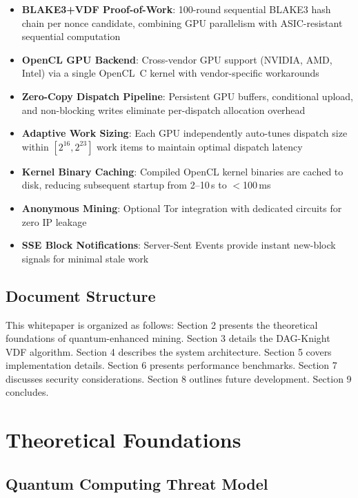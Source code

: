\documentclass[11pt,a4paper]{article}
\begin{document}
\begin{itemize}
    \item \textbf{BLAKE3+VDF Proof-of-Work}: 100-round sequential BLAKE3 hash chain per nonce candidate, combining GPU parallelism with ASIC-resistant sequential computation
    \item \textbf{OpenCL GPU Backend}: Cross-vendor GPU support (NVIDIA, AMD, Intel) via a single OpenCL~C kernel with vendor-specific workarounds
    \item \textbf{Zero-Copy Dispatch Pipeline}: Persistent GPU buffers, conditional upload, and non-blocking writes eliminate per-dispatch allocation overhead
    \item \textbf{Adaptive Work Sizing}: Each GPU independently auto-tunes dispatch size within $[2^{16}, 2^{23}]$ work items to maintain optimal dispatch latency
    \item \textbf{Kernel Binary Caching}: Compiled OpenCL kernel binaries are cached to disk, reducing subsequent startup from 2--10\,s to $<$100\,ms
    \item \textbf{Anonymous Mining}: Optional Tor integration with dedicated circuits for zero IP leakage
    \item \textbf{SSE Block Notifications}: Server-Sent Events provide instant new-block signals for minimal stale work
\end{itemize}

\subsection{Document Structure}

This whitepaper is organized as follows: Section 2 presents the theoretical foundations of quantum-enhanced mining. Section 3 details the DAG-Knight VDF algorithm. Section 4 describes the system architecture. Section 5 covers implementation details. Section 6 presents performance benchmarks. Section 7 discusses security considerations. Section 8 outlines future development. Section 9 concludes.

\section{Theoretical Foundations}

\subsection{Quantum Computing Threat Model}
\end{document}
